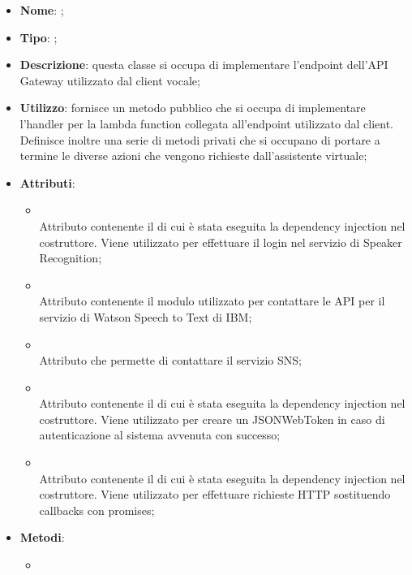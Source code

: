 \begin{itemize}
	\item \textbf{Nome}: ;
	\item \textbf{Tipo}: ;
	\item \textbf{Descrizione}: questa classe si occupa di implementare l'endpoint dell'API Gateway utilizzato dal client vocale;
	\item \textbf{Utilizzo}: fornisce un metodo pubblico che si occupa di implementare l'handler per la lambda function collegata all'endpoint utilizzato dal client. Definisce inoltre una serie di metodi privati che si occupano di portare a termine le diverse azioni che vengono richieste dall'assistente virtuale;
	\item \textbf{Attributi}:
	\begin{itemize}
		\item[]  \\
		Attributo contenente il  di cui è stata eseguita la dependency injection nel costruttore. Viene utilizzato per effettuare il login nel servizio di Speaker Recognition;
		\item[]  \\
		Attributo contenente il modulo utilizzato per contattare le API per il servizio di Watson Speech to Text di IBM;
		\item[]  \\
		Attributo che permette di contattare il servizio SNS;
		\item[]  \\
		Attributo contenente il  di cui è stata eseguita la dependency injection nel costruttore. Viene utilizzato per creare un JSONWebToken in caso di autenticazione al sistema avvenuta con successo;
		\item[]  \\
		Attributo contenente il  di cui è stata eseguita la dependency injection nel costruttore. Viene utilizzato per effettuare richieste HTTP sostituendo callbacks con promises;
	\end{itemize}
	\item \textbf{Metodi}:
	\begin{itemize}
		\item[]  \\

\end{itemize}
\end{itemize}
